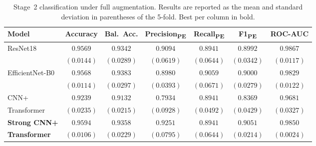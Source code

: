 \documentclass[preprint,12pt,authoryear]{elsarticle}
\begin{document}
\begin{table}
  \caption{Stage~2 classification under full augmentation. Results are reported as the mean and standard deviation in parentheses of the 5-fold. Best per column in bold.}
  \label{benchmark}
\begin{small}
  \centering
  \setlength{\tabcolsep}{5pt}
  \begin{tabular}{lcccccc}
    \toprule
    \textbf{Model}
      & \textbf{Accuracy}      & \textbf{Bal.\ Acc.}      & \textbf{Precision\textsubscript{PE}}      & \textbf{Recall\textsubscript{PE}}      & \textbf{F1\textsubscript{PE}}      & \textbf{ROC-AUC} \\
    \midrule
    ResNet18 & $0.9569$ & $0.9342$ & $0.9094$      & $0.8941$      & $0.8992$     & $\mathbf{0.9867}$ \\
     & $(0.0144)$ & $(0.0289)$      & $(0.0619)$      & $(0.0644)$      & $(0.0342)$      & $\mathbf{(0.0117)}$ \\
\hline
EfficientNet-B0      & $0.9568$      & $\mathbf{0.9383}$      & $0.8980$      & $\mathbf{0.9059}$      & $0.9000$      & $0.9829$ \\
      & $(0.0114)$      & $\mathbf{(0.0297)}$      & $(0.0393)$      & $\mathbf{(0.0671)}$      & $(0.0279)$      & $(0.0122)$ \\
\hline
    CNN+      & $0.9239$      & $0.9132$      & $0.7934$      & $0.8941$      & $0.8369$      & $0.9681$ \\
    Transformer      & $(0.0235)$      & $(0.0215)$      & $(0.0928)$      & $(0.0492)$      & $(0.0429)$      & $(0.0327)$ \\
\hline
    \textbf{Strong CNN+}      & $\mathbf{0.9594}$      & $0.9358$      & $\mathbf{0.9251}$      & $0.8941$      & $\mathbf{0.9051}$      & $0.9850$ \\
    \textbf{Transformer}      & $\mathbf{(0.0106)}$      & $(0.0229)$      & $\mathbf{(0.0795)}$      & $(0.0644)$      & $\mathbf{(0.0214)}$      & $(0.0024)$ \\
    \bottomrule
  \end{tabular}
\end{small}
\end{table}
\end{document}
